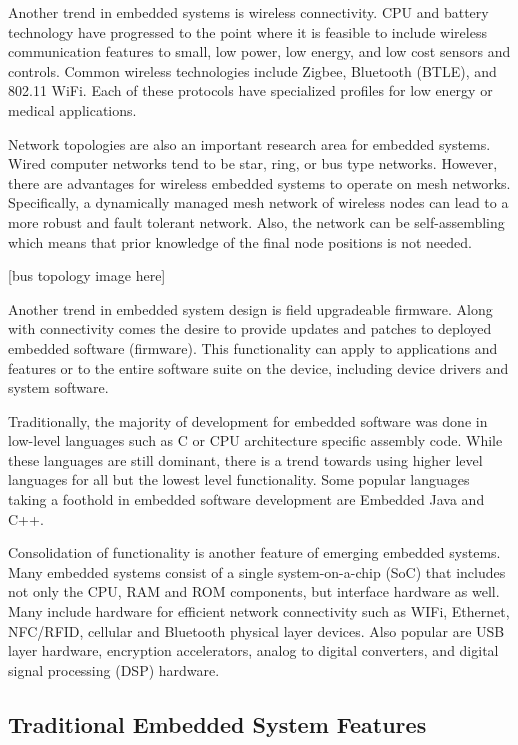\documentclass[final]{article}
\begin{document}
Another trend in embedded systems is wireless connectivity.  CPU and battery technology have progressed to the point where it is feasible to include wireless communication features to small, low power, low energy, and low cost sensors and controls.  Common wireless technologies include Zigbee, Bluetooth (BTLE), and 802.11 WiFi.  Each of these protocols have specialized profiles for low energy or medical applications.  

Network topologies are also an important research area for embedded systems.  Wired computer networks tend to be star, ring, or bus type networks.  However, there are advantages for wireless embedded systems to operate on mesh networks.  Specifically, a dynamically managed mesh network of wireless nodes can lead to a more robust and fault tolerant network.  Also, the network can be self-assembling which means that prior knowledge of the final node positions is not needed. 

[bus topology image here]

Another trend in embedded system design is field upgradeable firmware.  Along with connectivity comes the desire to provide updates and patches to deployed embedded software (firmware).  This functionality can apply to applications and features or to the entire software suite on the device, including device drivers and system software.

Traditionally, the majority of development for embedded software was done in low-level languages such as C or CPU architecture specific assembly code.  While these languages are still dominant, there is a trend towards using higher level languages for all but the lowest level functionality.  Some popular languages taking a foothold in embedded software development are Embedded Java and C++.

Consolidation of functionality is another feature of emerging embedded systems.  Many embedded systems consist of a single system-on-a-chip (SoC) that includes not only the CPU, RAM and ROM components, but interface hardware as well.  Many include hardware for efficient network connectivity such as WIFi, Ethernet, NFC/RFID, cellular and Bluetooth physical layer devices.  Also popular are USB layer hardware, encryption accelerators, analog to digital converters, and digital signal processing (DSP) hardware.

\subsection{Traditional Embedded System Features}
\end{document}
